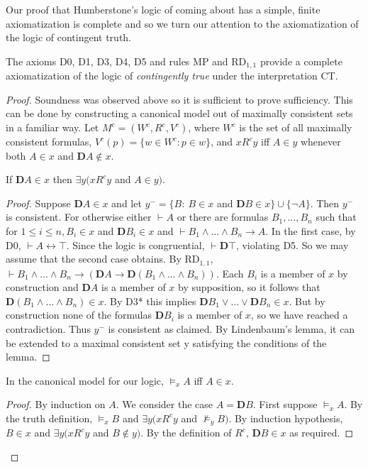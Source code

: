 \documentclass[11pt]{article}
\begin{document}
Our proof that Humberstone's logic of coming about has a simple, finite axiomatization is complete and so we turn our attention to the axiomatization of the logic of contingent truth.

\begin{theorem}
The axioms D0, D1, D3, D4, D5 and rules MP and RD$_{1,1}$ provide a complete axiomatization of the logic of \textit{contingently true} under the interpretation CT.
\end{theorem}
\begin{proof}
Soundness was observed above so it is sufficient to prove sufficiency. This can be done by constructing a canonical model out of maximally consistent sets in a familiar way. Let 
$M^c=(W^c\!, R^c\!,V^c)$, where $W^c$ is the set of all maximally consistent formulas, $V^c(p)=\{w{\in}W^c\!: p{\in}w\}$, and $xR^cy$ iff $A{\in}y$ whenever both $A{\in}x$ and $\mathbf{D}A{\notin}x$.

\begin{lemma} If $\mathbf{D}A{\in}x$ then $\exists y (xR^cy$ and $A{\in}y)$.
\end{lemma}
\begin{proof} Suppose $\mathbf{D}A {\in}x$ and let $y^- = \{B{:}~ B{\in}x$ and $\mathbf{D}B{\in}x\}\cup\{\neg A\}$. Then $y^-$ is consistent. For otherwise either $\vdash A$ or there are formulas $B_1,{\ldots},B_n$ such that for $1\le i\le n, B_i{\in}x$ and $\mathbf{D}B_i{\in}x$ and $\vdash B_1\wedge {\ldots}\wedge B_n\rightarrow A$. In the first case, by D0, $\vdash A{\leftrightarrow}\top $. Since the logic is congruential, $\vdash \mathbf{D}\top $, violating D5. So we may assume that the second case obtains. By RD$_{1,1}$, $\vdash B_1\wedge {\ldots}\wedge B_n\rightarrow (\mathbf{D}A\rightarrow \mathbf{D}(B_1\wedge {\ldots}\wedge B_n))$. Each $B_i$ is a member of $x$ by construction and $\mathbf{D}A$ is a member of $x$ by supposition, so it follows that $\mathbf{D}(B_1\wedge {\ldots}\wedge B_n){\in}x$. By D3* this implies $\mathbf{D}B_1\vee {\ldots}\vee \mathbf{D}B_n \in x$. But by construction none of the formulas $\mathbf{D}B_i$ is a member of $x$, so we have reached a contradiction. Thus $y^-$ is consistent as claimed. By Lindenbaum's lemma, it can be extended to a maximal consistent set y satisfying the conditions of the lemma.
\end{proof}
\begin{lemma}In the canonical model for our logic, $\models _x A$ iff $A{\in}x$.
\end{lemma}
\begin{proof} By induction on $A$. We consider the case $A=\mathbf{D}B$.
First suppose $\models _x A$. By the truth definition, $\models _x B$ and $\exists y (xR^cy$ and ${\nvDash_y}B)$. By induction hypothesis, $B{\in}x$ and $\exists y (xR^cy$ and $B{\notin}y)$. By the definition of $R^c$, $\mathbf{D}B{\in}x$ as required.


\end{proof}
\end{proof}
\end{document}
